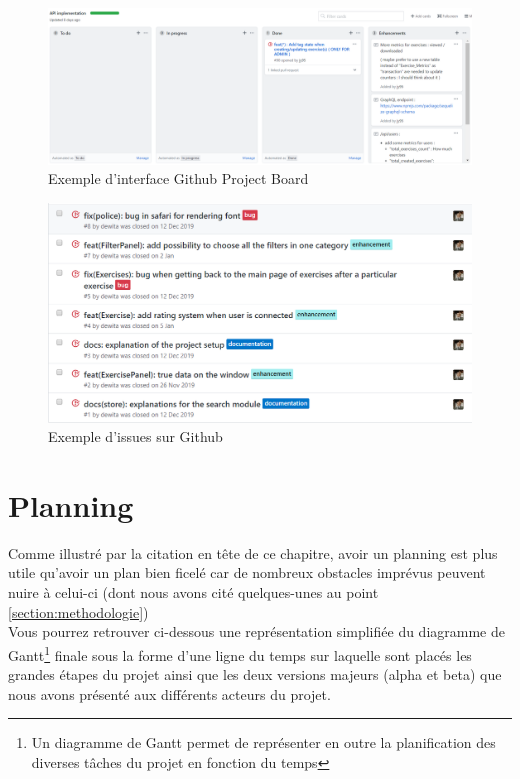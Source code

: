 \begin{figure}[H]
    \includegraphics[width=\textwidth,height=\textheight,keepaspectratio]{images/trelloLike.PNG}
    \centering
    \caption{Exemple d'interface Github Project Board}
    \label{pic:GithubBoard}
\end{figure}

\begin{figure}[H]
    \includegraphics[width=\textwidth,height=\textheight,keepaspectratio]{images/issueList.PNG}
    \centering
    \caption{Exemple d'issues sur Github}
    \label{pic:GithubIssues}
\end{figure}

\section{Planning}
Comme illustré par la citation en tête de ce chapitre, avoir un planning est plus utile qu'avoir un plan bien ficelé car de nombreux obstacles imprévus peuvent nuire à celui-ci (dont nous avons cité quelques-unes au point  \ref{section:methodologie})\\

Vous pourrez retrouver ci-dessous une représentation simplifiée du diagramme de Gantt\footnote{Un diagramme de Gantt permet de représenter en outre la planification des diverses tâches du projet en fonction du temps } finale sous la forme d'une ligne du temps sur laquelle sont placés les grandes étapes du projet ainsi que les deux versions majeurs (alpha et beta) que nous avons présenté aux différents acteurs du projet.\\


